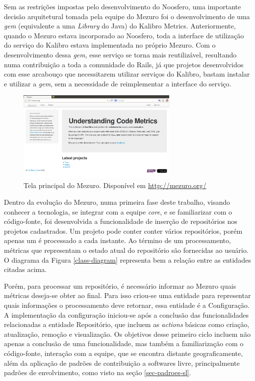 Sem as restrições impostas pelo desenvolvimento do Noosfero, uma importante decisão arquitetural tomada pela equipe do Mezuro foi o desenvolvimento de uma \textit{gem} (equivalente a uma \textit{Library} do Java) do Kalibro Metrics. Anteriormente, quando o Mezuro estava incorporado ao Noosfero, toda a interface de utilização do serviço do Kalibro estava implementada no próprio Mezuro. Com o desenvolvimento dessa \textit{gem}, esse serviço se torna mais reutilizável, resultando numa contribuição a toda a comunidade do Rails, já que projetos desenvolvidos com esse arcabouço que necessitarem utilizar serviços do Kalibro, bastam instalar e utilizar a \textit{gem}, sem a necessidade de reimplementar a interface do serviço.

\graphicspath{{figuras/}}
\begin{figure}[h]
\centering
\includegraphics[width=0.7\textwidth]{mezuro-standalone}
\caption{Tela principal do Mezuro. Disponível em \url{http://mezuro.org/}}
\label{mezuro}
\end{figure}

Dentro da evolução do Mezuro, numa primeira fase deste trabalho, visando conhecer a tecnologia, se integrar com a equipe \textit{core}, e se familiarizar com o código-fonte, foi desenvolvida a funcionalidade de inserção de repositórios nos projetos cadastrados. Um projeto pode conter conter vários repositórios, porém apenas um é processado a cada instante. Ao término de um processamento, métricas que representam o estado atual do repositório são fornecidas ao usuário. O diagrama da Figura \ref{class-diagram} representa bem a relação entre as entidades citadas acima. 

Porém, para processar um repositório, é necessário informar ao Mezuro quais métricas deseja-se obter ao final. Para isso criou-se uma entidade para representar quais informações o processamento deve retornar, essa entidade é a Configuração.
%
A implementação da configuração iniciou-se após a conclusão das funcionalidades relacionadas a entidade Repositório, que incluem as \textit{actions} básicas como criação, atualização, remoção e visualização. Os objetivos desse primeiro ciclo incluem não apenas a conclusão de uma funcionalidade, mas também a familiarização com o código-fonte, interação com a equipe, que se encontra distante geograficamente, além da aplicação de padrões de contribuição a softwares livre, principalmente padrões de envolvimento, como visto na seção \ref{sec-padroes-sl}.

